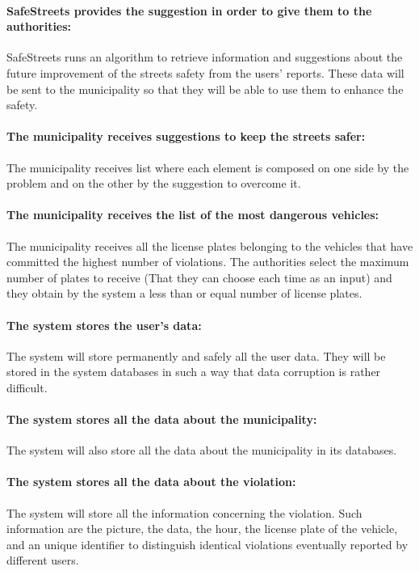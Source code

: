 \documentclass[titlepage]{article}
\begin{document}
\paragraph{SafeStreets provides the suggestion in order to give them to the authorities: }
SafeStreets runs an algorithm to retrieve information and suggestions about the future improvement of the streets safety from the users' reports. These data will be sent to the municipality so that they will be able to use them to enhance the safety.
\paragraph{The municipality receives suggestions to keep the streets safer: }
The municipality receives list where each element is composed on one side by the problem and on the other by the suggestion to overcome it.
\paragraph{The municipality receives the list of the most 			dangerous vehicles: }
The municipality receives all the license plates belonging to the vehicles that have committed the highest number of violations. The authorities select the maximum number of plates to receive (That they can choose each time as an input) and they obtain by the system a less than or equal number of license plates.
\paragraph{The system stores the user's data:}
The system will store permanently and safely all the user data. They will be stored in the system databases in such a way that data corruption is rather difficult.
\paragraph{The system stores all the data about the 					municipality:}
The system will also store all the data about the municipality in its databases.
\paragraph{The system stores all the data about the violation: }
The system will store all the information concerning the violation. Such information are the picture, the data, the hour, the license plate of the vehicle, and an unique identifier to distinguish identical violations eventually reported by different users.
\end{document}
